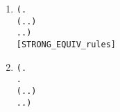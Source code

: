 \begin{enumerate}
\item \begin{alltt}
\HOLTokenTurnstile{} (\HOLSymConst{\HOLTokenForall{}}.
        (\HOLSymConst{\HOLTokenForall{}}.  \HOLTokenTransBegin{}\HOLTokenTransEnd {} \HOLSymConst{\HOLTokenImp{}} \HOLSymConst{\HOLTokenExists{}}.  \HOLTokenTransBegin{}\HOLTokenTransEnd {} \HOLSymConst{\HOLTokenConj{}}  \HOLSymConst{\HOLTokenStrongEQ} ) \HOLSymConst{\HOLTokenConj{}}
        \HOLSymConst{\HOLTokenForall{}}.  \HOLTokenTransBegin{}\HOLTokenTransEnd {} \HOLSymConst{\HOLTokenImp{}} \HOLSymConst{\HOLTokenExists{}}.  \HOLTokenTransBegin{}\HOLTokenTransEnd {} \HOLSymConst{\HOLTokenConj{}}  \HOLSymConst{\HOLTokenStrongEQ} ) \HOLSymConst{\HOLTokenImp{}}
    \HOLSymConst{\HOLTokenStrongEQ} \hfill{[STRONG_EQUIV_rules]}
\end{alltt}
\item \begin{alltt}
\HOLTokenTurnstile{} (\HOLSymConst{\HOLTokenForall{}} .
           \HOLSymConst{\HOLTokenImp{}}
        \HOLSymConst{\HOLTokenForall{}}.
            (\HOLSymConst{\HOLTokenForall{}}.  \HOLTokenTransBegin{}\HOLTokenTransEnd {} \HOLSymConst{\HOLTokenImp{}} \HOLSymConst{\HOLTokenExists{}}.  \HOLTokenTransBegin{}\HOLTokenTransEnd {} \HOLSymConst{\HOLTokenConj{}}   ) \HOLSymConst{\HOLTokenConj{}}
            \HOLSymConst{\HOLTokenForall{}}.  \HOLTokenTransBegin{}\HOLTokenTransEnd {} \HOLSymConst{\HOLTokenImp{}} \HOLSymConst{\HOLTokenExists{}}.  \HOLTokenTransBegin{}\HOLTokenTransEnd {} \HOLSymConst{\HOLTokenConj{}}   ) \HOLSymConst{\HOLTokenImp{}}

\end{alltt}
\end{enumerate}
